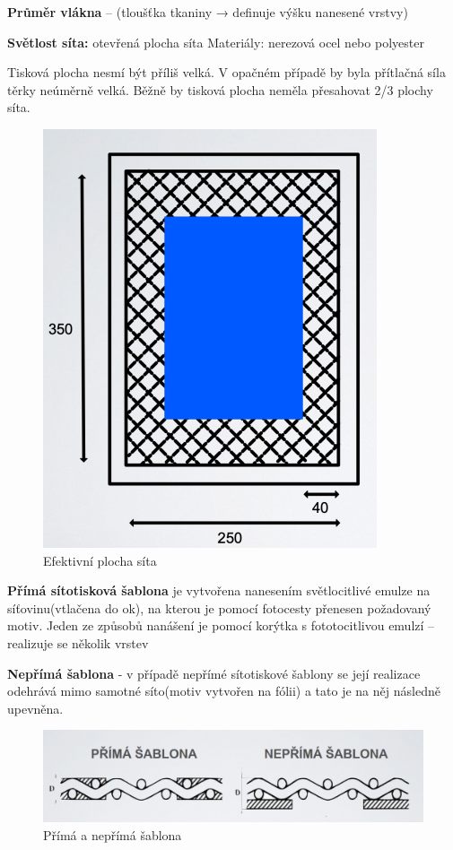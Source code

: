 \textbf{Průměr vlákna }– (tloušťka tkaniny → definuje výšku nanesené vrstvy)

\textbf{Světlost síta:} otevřená plocha síta
Materiály: nerezová ocel nebo polyester

Tisková plocha nesmí být příliš velká. V opačném případě by byla přítlačná
síla těrky neúměrně velká. Běžně by tisková plocha neměla přesahovat 2/3 plochy síta.

\begin{figure}[h]
   \begin{center}
     \includegraphics[scale=0.6]{images/Sito2.png}
   \end{center}
   \caption{Efektivní plocha síta}
\end{figure}

\textbf{Přímá sítotisková šablona} je vytvořena nanesením světlocitlivé emulze na
síťovinu(vtlačena do ok), na kterou je pomocí fotocesty přenesen požadovaný
motiv. Jeden ze způsobů nanášení je pomocí korýtka s fototocitlivou emulzí – realizuje se několik vrstev

\textbf{Nepřímá šablona} - v případě nepřímé sítotiskové šablony se její realizace
odehrává mimo samotné síto(motiv vytvořen na fólii) a tato je na něj
následně upevněna.

\begin{figure}[h]
   \begin{center}
     \includegraphics[scale=0.6]{images/Sablona.png}
   \end{center}
   \caption{Přímá a nepřímá šablona}
\end{figure}

